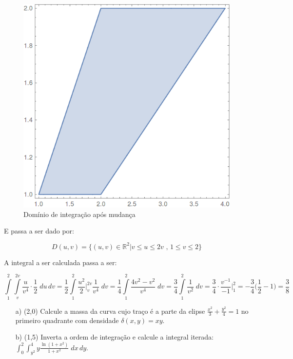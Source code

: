 \documentclass[12pt,a4paper]{article}
\newcommand{\re}{\mathbb{R}}
\begin{document}
\begin{itemize}
\begin{figure}[H]
	\centering
	\includegraphics[scale=0.25]{Fig1b-2.png}  
	\caption{Domínio de integração após mudança}
	\label{fig:figura1b2}
\end{figure}
E passa a ser dado por:

$$D(u,v)=\{(u,v)\in \re^2|v \leq u \leq 2v\,\,\mbox{,}\,\,1 \leq v \leq 2 \}$$

A integral a ser calculada passa a ser:

$$ \int\limits_1^2 \int\limits_v^{2v} \frac{u}{v^4} \cdot \frac{1}{2} \; du \, dv = \frac{1}{2} \int\limits_1^2  \frac{u^2}{2} \Big|_v^{2v} \frac{1}{v^4}  \; dv = \frac{1}{4} \int\limits_1^2  \frac{4v^2 - v^2}{v^4}  \; dv = \frac{3}{4} \int\limits_1^2  \frac{1}{v^2}  \; dv = \frac{3}{4} \cdot \frac{v^{-1}}{-1} \Big|_1^2 = -\frac{3}{4} \Big( \frac{1}{2} -1 \Big) = \frac{3}{8} $$

\end{itemize}

\newpage


\begin{itemize}
\item[a)] (2,0) Calcule a massa da curva cujo traço é a parte da elipse $\displaystyle\frac{x^2}{3} + \displaystyle\frac{y^2}{4} = 1 $ no primeiro quadrante com densidade $\delta(x,y) = xy$. \\
\item[b)] (1,5) Inverta a ordem de integração e calcule a integral iterada: $\displaystyle\int_0^2 \int_{y^2}^4 y \frac{\ln (1+x^2)}{1+x^2} \; dx \, dy$.
\end{itemize}
\end{document}
